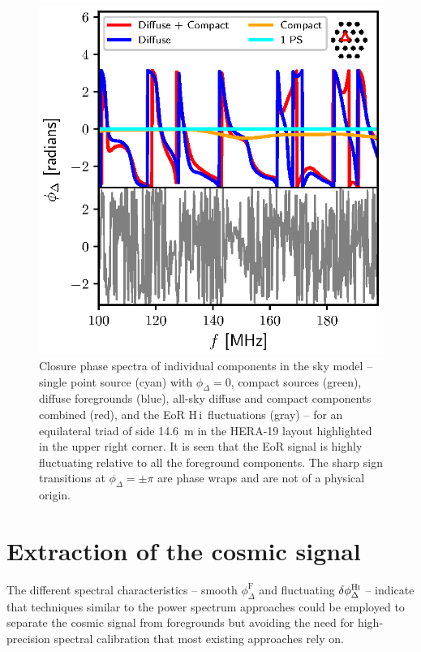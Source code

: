 \documentclass[
reprint,
superscriptaddress,
amsmath,
amssymb,
aps,
prd
]{revtex4-1}
\newcommand{\HI}{H\,{\sc i}}
\begin{document}
\begin{figure}[htb]
\includegraphics[width=0.85\linewidth]{closure_phase_spectra_1_15_16}
\caption{Closure phase spectra of individual components in the sky model -- single point source (cyan) with $\phi_\Delta=0$, compact sources (green), diffuse foregrounds (blue), all-sky diffuse and compact components combined (red), and the EoR \HI\ fluctuations (gray) -- for an equilateral triad of side 14.6~m in the HERA-19 layout highlighted in the upper right corner. It is seen that the EoR signal is highly fluctuating relative to all the foreground components. The sharp sign transitions at $\phi_\Delta=\pm \pi$ are phase wraps and are not of a physical origin. \label{fig:cp-spectra}}
\end{figure}

\section{Extraction of the cosmic signal}\label{sec:extraction}

The different spectral characteristics -- smooth $\phi_\Delta^\textrm{F}$ and fluctuating $\delta\phi_\Delta^\textrm{H{\sc i}}$ -- indicate that techniques similar to the power spectrum approaches could be employed to separate the cosmic signal from foregrounds but avoiding the need for high-precision spectral calibration that most existing approaches rely on.
\end{document}
